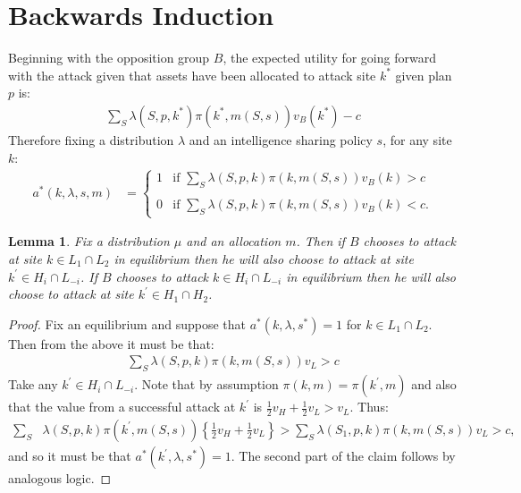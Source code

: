 \documentclass[12pt]{article}
\newtheorem{lemma}[theorem]{Lemma}
\begin{document}
\section*{Backwards Induction}



Beginning with the opposition group $B$, the expected utility for going forward with the attack given that assets have been allocated to attack site $k^*$ given plan $p$ is:
\begin{align*}
\sum_{S}\lambda(S,p,k^*)\pi(k^*,m(S,s))v_B(k^*)-c
\end{align*}Therefore fixing a distribution $\lambda$ and an intelligence sharing policy $s$, for any site $k$:
\begin{align*}
a^*(k,\lambda,s,m)&=\left\{\begin{array}{ll}
1&\mbox{if }\sum_{S}\lambda(S,p,k)\pi(k,m(S,s))v_B(k)>c
\\
&\\
0&\mbox{if }\sum_{S}\lambda(S,p,k)\pi(k,m(S,s))v_B(k)<c.
\end{array}\right.
\end{align*}



\vspace{20mm}
\begin{lemma}Fix a distribution $\mu$ and an allocation $m$.  Then if $B$ chooses to attack at site $k\in L_1\cap L_2$ in equilibrium then he will also choose to attack at site $k^{\prime}\in H_i\cap L_{-i}$.  If $B$ chooses to attack $k\in H_i\cap L_{-i}$ in equilibrium then he will also choose to attack at site $k^{\prime}\in H_1\cap H_2$.
\end{lemma}
\begin{proof}Fix an equilibrium and suppose that $a^*(k,\lambda,s^*)=1$ for $k\in L_1\cap L_2$.  Then from the above it must be that:
\begin{align*}
\sum_{S}\lambda(S,p,k)\pi(k,m(S,s))v_L>c
\end{align*}Take any $k^{\prime}\in H_i\cap L_{-i}$.  Note that by assumption $\pi(k,m)=\pi(k^{\prime},m)$ and also that the value from a successful attack at $k^{\prime}$ is $\frac{1}{2}v_H+\frac{1}{2}v_L>v_L$.  Thus:
\begin{align*}
\sum_{S}&\lambda(S,p,k)\pi(k^{\prime},m(S,s))\left\{\frac{1}{2}v_H+\frac{1}{2}v_L\right\}>\sum_{S}\lambda(S_1,p,k)\pi(k,m(S,s))v_L>c,
\end{align*}and so it must be that $a^*(k^{\prime},\lambda,s^*)=1$.  The second part of the claim follows by analogous logic.%
\end{proof}
\end{document}
